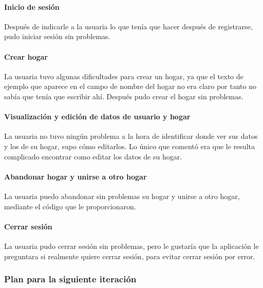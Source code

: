 \paragraph{Inicio de sesión}
\parbox{\textwidth}{ 
   
}

Después de indicarle a la usuaria lo que tenía que hacer después de registrarse, pudo iniciar sesión sin problemas.

\paragraph{Crear hogar}
\parbox{\textwidth}{ 
   
}

La usuaria tuvo algunas dificultades para crear un hogar, ya que el texto de ejemplo que aparece en el campo de
nombre del hogar no era claro por tanto no sabía que tenía que escribir ahí. Después pudo crear el hogar sin problemas.

\paragraph{Visualización y edición de datos de usuario y hogar}
\parbox{\textwidth}{ 
   
}

La usuaria no tuvo ningún problema a la hora de identificar donde ver sus datos y los de su hogar, supo cómo 
editarlos. Lo único que comentó era que le resulta complicado encontrar como editar los datos de su hogar.

\paragraph{Abandonar hogar y unirse a otro hogar}
\parbox{\textwidth}{ 
   
}

La usuaria puedo abandonar sin problemas su hogar y unirse a otro hogar, mediante el código que le proporcionaron.

\paragraph{Cerrar sesión}
\parbox{\textwidth}{ 
   
}

La usuaria pudo cerrar sesión sin problemas, pero le gustaría que la aplicación le preguntara si realmente quiere cerrar sesión, para 
evitar cerrar sesión por error.


\subsubsection{Plan para la siguiente iteración}

